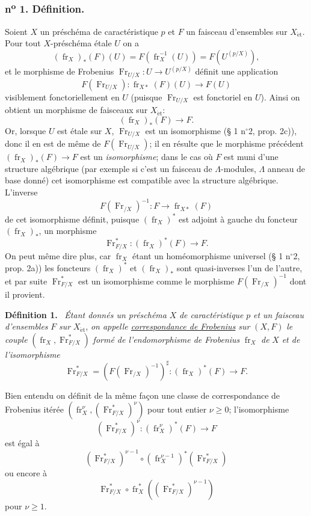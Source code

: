 \documentclass[11pt]{article}
\newenvironment{statement}[1]{\par\medskip\noindent\textbf{#1.}\ }{\par\medskip}
\providecommand{\et}{\mathrm{\acute{e}t}}
\providecommand{\fr}{\operatorname{fr}}
\providecommand{\Fr}{\operatorname{Fr}}
\providecommand{\Fr}{\operatorname{Fr}}
\providecommand{\fr}{\operatorname{fr}}
\providecommand{\et}{\acute{e}t}
\begin{document}
\subsubsection*{n\textsuperscript{o} 1. Définition.}

Soient $X$ un préschéma de caractéristique $p$ et $F$ un faisceau d'ensembles sur $X_{\et}$. Pour tout $X$-préschéma étale $U$ on a
\[
(\fr_X)_*(F)(U)=F(\fr_X^{-1}(U))=F(U^{(p/X)}),
\]
et le morphisme de Frobenius $\Fr_{U/X}:U\to U^{(p/X)}$ définit une application
\[
F(\Fr_{U/X}):\fr_{X*}(F)(U)\longrightarrow F(U)
\]
visiblement fonctoriellement en $U$ (puisque $\Fr_{U/X}$ est fonctoriel en $U$). Ainsi on obtient un morphisme de faisceaux sur $X_{\et}$:
\[
(\fr_X)_*(F)\longrightarrow F.
\]
Or, lorsque $U$ est étale sur $X$, $\Fr_{U/X}$ est un isomorphisme (§ 1 n$^\circ$2, prop. 2c)), donc il en est de même de $F(\Fr_{U/X})$; il en résulte que le morphisme précédent $(\fr_X)_*(F)\to F$ est un \emph{isomorphisme}; dans le cas où $F$ est muni d'une structure algébrique (par exemple si c'est un faisceau de $\Lambda$-modules, $\Lambda$ anneau de base donné) cet isomorphisme est compatible avec la structure algébrique. L'inverse
\[
F(\Fr_{/X})^{-1}:F\longrightarrow \fr_{X*}(F)
\]
de cet isomorphisme définit, puisque 
$(\fr_X)^*$ est
adjoint à gauche du foncteur $(\fr_X)_*$, un morphisme
\[
\Fr^*_{F/X}:(\fr_X)^*(F)\longrightarrow F.
\]
On peut même dire plus, car $\fr_X$ étant un homéomorphisme universel (§ 1 n$^\circ$2, prop. 2a)) les foncteurs $(\fr_X)^*$ et $(\fr_X)_*$ sont quasi-inverses l'un de l'autre, et par suite $\Fr^*_{F/X}$ est un isomorphisme comme le morphisme $F(\Fr_{/X})^{-1}$ dont il provient.

\begin{statement}{Définition 1}
\emph{Étant donnés un préschéma} $X$ \emph{de caractéristique} $p$ \emph{et un faisceau d'ensembles} $F$ \emph{sur} $X_{\et}$, \emph{on appelle \underline{correspondance de Frobenius} sur} $(X,F)$ \emph{le couple} $(\fr_X,\Fr^*_{F/X})$ \emph{formé de l'endomorphisme de Frobenius} $\fr_X$ \emph{de} $X$ \emph{et de l'isomorphisme}
\[
\Fr^*_{F/X}=(F(\Fr_{/X})^{-1})^\sharp:(\fr_X)^*(F)\longrightarrow F.
\]
\end{statement}

Bien entendu on définit de la même façon une classe de correspondance de Frobenius itérée $(\fr_X^\nu,(\Fr^*_{F/X})^\nu)$ pour tout entier $\nu\geq0$; l'isomorphisme
\[
(\Fr^*_{F/X})^\nu:(\fr_X^\nu)^*(F)\longrightarrow F
\]
est égal à
\[
(\Fr^*_{F/X})^{\nu-1}\circ (\fr_X^{\nu-1})^*(\Fr^*_{F/X})
\]
ou encore à
\[
\Fr^*_{F/X}\circ\fr_X^*((\Fr^*_{F/X})^{\nu-1})
\]
pour $\nu\geq1$.
\end{document}
